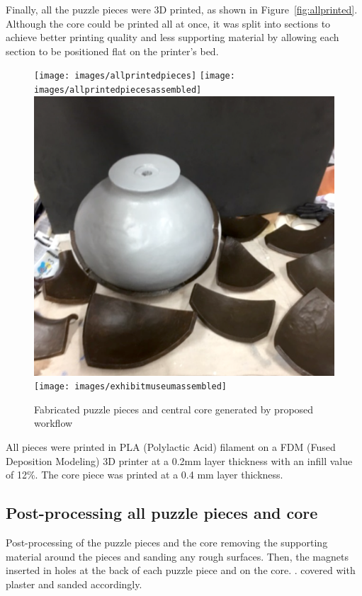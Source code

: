 \documentclass[acmlarge,screen,dvipsnames]{acmart}
\begin{document}
Finally, all the puzzle pieces were 3D printed, as shown in
Figure~\ref{fig:allprinted}. Although the core could be printed all at
once, it was split into  sections to achieve better printing
quality and less supporting material by allowing each section to be
positioned flat on the printer's bed.

\begin{figure}[htb]
  \centering
  {\texttt{[image: images/allprintedpieces]}}
  {\texttt{[image: images/allprintedpiecesassembled]}}\\
   {\includegraphics[width=0.4299\linewidth]{images/painting}}
  {\texttt{[image: images/exhibitmuseumassembled]}}
    \caption{Fabricated puzzle pieces and central core generated by proposed workflow }
\end{figure}

All pieces were printed in PLA (Polylactic Acid) filament on a FDM
(Fused Deposition Modeling) 3D printer at a 0.2mm layer thickness with
an infill value of 12\%. The core piece was printed at a 0.4 mm layer
thickness.


\subsection{Post-processing all puzzle pieces and core}

Post-processing of the puzzle pieces and the core  removing
the supporting material around the pieces and sanding any rough
surfaces. Then, the magnets  inserted in holes at the back of each
puzzle piece and on the core. .  covered \MSedit[afterwards]{} with plaster and sanded accordingly.
\end{document}
